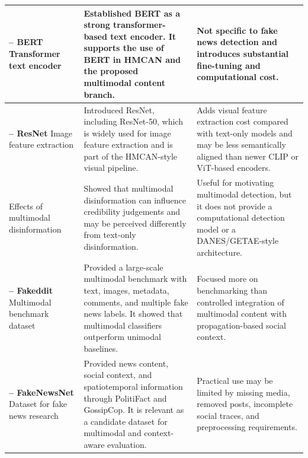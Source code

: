 {\begin{longtable}{
>{\raggedright\arraybackslash}p{}
>{\raggedright\arraybackslash}p{}
>{\raggedright\arraybackslash}p{}
}
\midrule

\textbf{\citet{Devlin2019} -- BERT} \newline
Transformer text encoder
&
Established BERT as a strong transformer-based text encoder. It supports the use of BERT in HMCAN and the proposed multimodal content branch.
&
Not specific to fake news detection and introduces substantial fine-tuning and computational cost. \\

\midrule

\textbf{\citet{He2016} -- ResNet} \newline
Image feature extraction
&
Introduced ResNet, including ResNet-50, which is widely used for image feature extraction and is part of the HMCAN-style visual pipeline.
&
Adds visual feature extraction cost compared with text-only models and may be less semantically aligned than newer CLIP or ViT-based encoders. \\

\midrule

\textbf{\citet{hameleers2020}} \newline
Effects of multimodal disinformation
&
Showed that multimodal disinformation can influence credibility judgements and may be perceived differently from text-only disinformation.
&
Useful for motivating multimodal detection, but it does not provide a computational detection model or a DANES/GETAE-style architecture. \\

\midrule

\textbf{\citet{Nakamura2020} -- Fakeddit} \newline
Multimodal benchmark dataset
&
Provided a large-scale multimodal benchmark with text, images, metadata, comments, and multiple fake news labels. It showed that multimodal classifiers outperform unimodal baselines.
&
Focused more on benchmarking than controlled integration of multimodal content with propagation-based social context. \\

\midrule

\textbf{\citet{shu2020fakenewsnet} -- FakeNewsNet} \newline
Dataset for fake news research
&
Provided news content, social context, and spatiotemporal information through PolitiFact and GossipCop. It is relevant as a candidate dataset for multimodal and context-aware evaluation.
&
Practical use may be limited by missing media, removed posts, incomplete social traces, and preprocessing requirements. \\


\end{longtable}}
